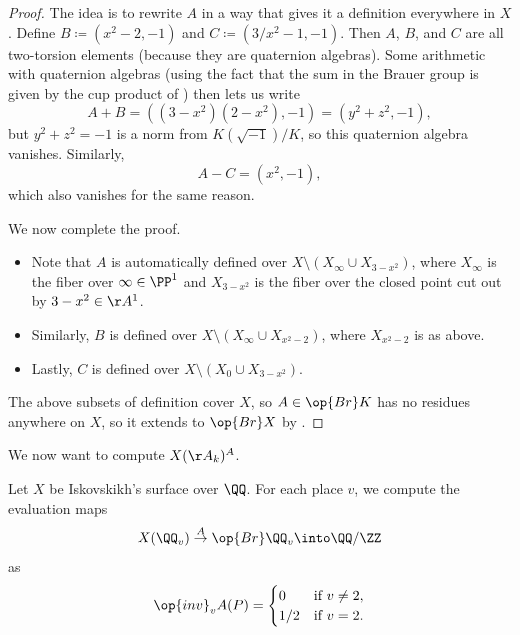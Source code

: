 \documentclass[../notes.tex]{subfiles}
\begin{document}
\begin{proof}
	The idea is to rewrite $A$ in a way that gives it a definition everywhere in $X$. Define $B\coloneqq\left(x^2-2,-1\right)$ and $C\coloneqq\left(3/x^2-1,-1\right)$. Then $A$, $B$, and $C$ are all two-torsion elements (because they are quaternion algebras). Some arithmetic with quaternion algebras (using the fact that the sum in the Brauer group is given by the cup product of ) then lets us write
	\[A+B=\left(\left(3-x^2\right)\left(2-x^2\right),-1\right)=\left(y^2+z^2,-1\right),\]
	but $y^2+z^2=-1$ is a norm from $K(\sqrt{-1})/K$, so this quaternion algebra vanishes. Similarly,
	\[A-C=\left(x^2,-1\right),\]
	which also vanishes for the same reason.

	We now complete the proof.
	\begin{itemize}
		\item Note that $A$ is automatically defined over $X\setminus(X_\infty\cup X_{3-x^2})$, where $X_\infty$ is the fiber over $\infty\in\PP^1$ and $X_{3-x^2}$ is the fiber over the closed point cut out by $3-x^2\in\AA^1$.
		\item Similarly, $B$ is defined over $X\setminus(X_\infty\cup X_{x^2-2})$, where $X_{x^2-2}$ is as above.
		\item Lastly, $C$ is defined over $X\setminus(X_0\cup X_{3-x^2})$.
	\end{itemize}
	The above subsets of definition cover $X$, so $A\in\op{Br}K$ has no residues anywhere on $X$, so it extends to $\op{Br}X$ by .
\end{proof}
We now want to compute $X(\AA_k)^A$.
\begin{lemma} \label{lem:isok-invs}
	Let $X$ be Iskovskikh's surface over $\QQ$. For each place $v$, we compute the evaluation maps
	\[X(\QQ_v)\stackrel A\to\op{Br}\QQ_v\into\QQ/\ZZ\]
	as
	\[\op{inv}_vA(P)=\begin{cases}
		0 & \text{if }v\ne2, \\
		1/2 & \text{if }v=2.
	\end{cases}\]
\end{lemma}
\end{document}
